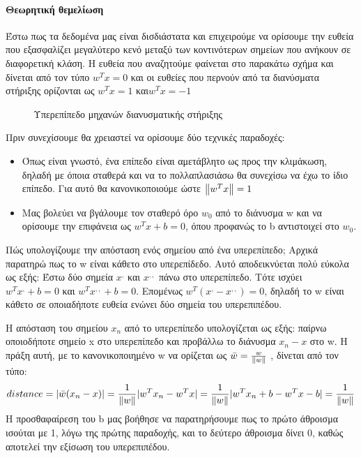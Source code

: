 \paragraph{Θεωρητική θεμελίωση} Έστω πως τα δεδομένα μας είναι δισδιάστατα και επιχειρούμε να ορίσουμε την ευθεία που εξασφαλίζει μεγαλύτερο κενό μεταξύ των κοντινότερων σημείων που ανήκουν σε διαφορετική κλάση. Η ευθεία που αναζητούμε φαίνεται στο παρακάτω σχήμα και δίνεται από τον τύπο $w^T x = 0$ και οι ευθείες που περνούν από τα διανύσματα στήριξης ορίζονται ως $w^T x = 1$ και$ w^T x =-1$
\begin{figure}[H]
	\centering			
	\caption[Υπερεπίπεδο μηχανών διανυσματικής στήριξης]{Υπερεπίπεδο μηχανών διανυσματικής στήριξης}
\end{figure}
Πριν συνεχίσουμε θα χρειαστεί να ορίσουμε δύο τεχνικές παραδοχές:
\begin{itemize}
	\item Όπως είναι γνωστό, ένα επίπεδο είναι αμετάβλητο ως προς την κλιμάκωση, δηλαδή με όποια σταθερά και να το πολλαπλασιάσω θα συνεχίσω να έχω το ίδιο επίπεδο. Για αυτό θα κανονικοποιούμε ώστε $\left\lVert w^T x\right\rVert=1$
	\item  Μας βολεύει να βγάλουμε τον σταθερό όρο $w_0$ από το διάνυσμα w και να ορίσουμε την επιφάνεια ως $w^T  x + b = 0$, όπου προφανώς το b αντιστοιχεί στο $w_0$.	
\end{itemize}

Πώς υπολογίζουμε την απόσταση ενός σημείου από ένα υπερεπίπεδο;
Αρχικά παρατηρώ πως το w είναι κάθετο στο υπερεπίδεδο. Αυτό αποδεικνύεται πολύ εύκολα ως εξής: Έστω δύο σημεία $x^,$ και $x^{,,}$ πάνω στο υπερεπίπεδο. Τότε ισχύει $w^T  x^, + b = 0$ και $w^T  x^{,,} + b = 0$. Επομένως $w^T (x^, -  x^{,,}) = 0$, δηλαδή το w είναι κάθετο σε οποιαδήποτε ευθεία ενώνει δύο σημεία του υπερεπιπέδου.

Η απόσταση του σημείου $x_n$ από το υπερεπίπεδο υπολογίζεται ως εξής: παίρνω οποιοδήποτε σημείο x στο υπερεπίπεδο και προβάλλω το διάνυσμα $x_n - x$ στο w. Η πράξη αυτή, με το κανονικοποιημένο w να ορίζεται ως $\bar{w}=\frac{w}{\left\lVert w\right\rVert}$ , δίνεται από τον τύπο:
\begin{equation}
distance=\lvert\bar{w} (x_n -x)\rvert =\frac{1}{\left\lVert w\right\rVert} \lvert w^T x_n - w^T x\rvert
=\frac{1}{\left\lVert w\right\rVert} \lvert w^T x_n  +b - w^T x -b\rvert=\frac{1}{\left\lVert w\right\rVert} 
\end{equation}
Η προσθαφαίρεση του b μας βοήθησε να παρατηρήσουμε πως το πρώτο άθροισμα ισούται με 1, λόγω της πρώτης παραδοχής, και το δεύτερο άθροισμα δίνει 0, καθώς αποτελεί την εξίσωση του υπερεπιπέδου.

